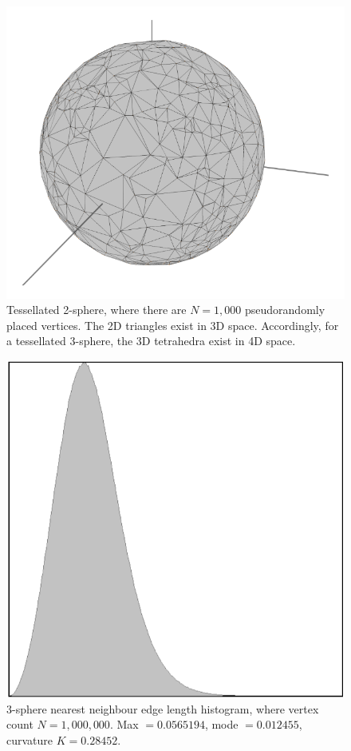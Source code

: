 \documentclass[12pt]{article}
\begin{document}
\begin{figure} 
\centering
  \includegraphics[width = 3 in]{2sphere.png}	
  \caption{Tessellated 2-sphere, where there are $N = 1,000$ pseudorandomly placed vertices.
The 2D triangles exist in 3D space.
Accordingly, for a tessellated 3-sphere, the 3D tetrahedra exist in 4D space. }
\end{figure}





\begin{figure} 
\centering
  \includegraphics[width = 3 in]{histogram_1000000.png}	
  \caption{3-sphere nearest neighbour edge length histogram, where vertex count $N = 1,000,000$. Max $= 0.0565194$, mode $= 0.012455$, curvature $K = 0.28452$.}
\end{figure}
\end{document}
